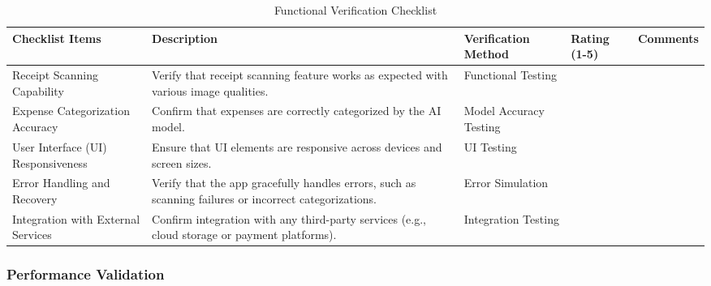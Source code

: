 \documentclass[12pt, titlepage]{article}
\begin{document}
\begin{table}[h!]
	\caption{Functional Verification Checklist}
\noindent \begin{tabular}{|>{\raggedright\arraybackslash}p{3cm}|>{\raggedright\arraybackslash}p{4cm}|>{\raggedright\arraybackslash}p{3cm}|p{1cm}|p{2.25cm}|}
	\hline
	\textbf{Checklist Items} & \textbf{Description} & \textbf{Verification Method} & \textbf{Rating (1-5)} & \textbf{Comments} \\ 
	\hline
	Receipt Scanning Capability	& Verify that receipt scanning feature works as expected with various image qualities. & Functional Testing	& & \\
	\hline
	Expense Categorization Accuracy	& Confirm that expenses are correctly categorized by the AI model. & Model Accuracy Testing	& & \\
	\hline
	User Interface (UI) Responsiveness & Ensure that UI elements are responsive across devices and screen sizes. & UI Testing & & \\
	\hline
	Error Handling and Recovery	& Verify that the app gracefully handles errors, such as scanning failures or incorrect categorizations. & Error Simulation	& & \\
	\hline
	Integration with External Services & Confirm integration with any third-party services (e.g., cloud storage or payment platforms). & Integration Testing & & \\
	\hline
\end{tabular}
\end{table}

\newpage

\subsubsection{Performance Validation}
\end{document}
